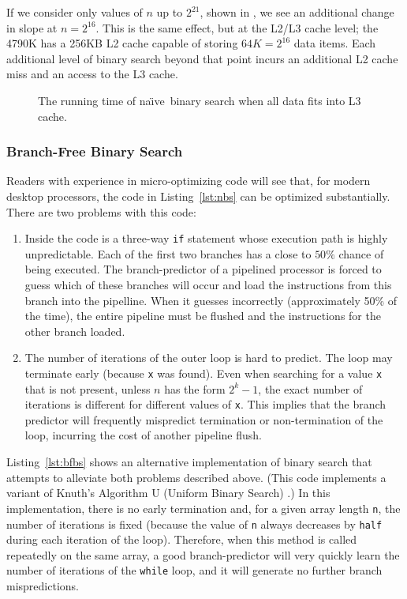 \documentclass{patmorin}
\newcommand{\lstref}[1]{Listing~\ref{lst:#1}}
\newcommand{\Lstref}[1]{\lstref{#1}}
\newcommand{\naive}{na\"{\i}ve}
\begin{document}
If we consider only values of $n$ up to $2^{21}$, shown in
, we see an additional change in slope at
$n=2^{16}$.  This is the same effect, but at the L2/L3 cache level; the
4790K has a 256KB L2 cache capable of storing $64K=2^{16}$ data items.
Each additional level of binary search beyond that point incurs an
additional L2 cache miss and an access to the L3 cache.

\begin{figure}
   \caption{The running time of \naive\ binary search when all data
    fits into L3 cache.}
\end{figure}


\subsubsection{Branch-Free Binary Search}

Readers with experience in micro-optimizing code will see that, for
modern desktop processors, the code in \lstref{nbs} can be optimized
substantially.  There are two problems with this code:

\begin{enumerate}

\item Inside the code is a three-way \texttt{if} statement whose
execution path is highly unpredictable. Each of the first two branches
has a close to $50\%$ chance of being executed.  The branch-predictor of
a pipelined processor is forced to guess which of these branches will
occur and load the instructions from this branch into the pipelline.
When it guesses incorrectly (approximately 50\% of the time), the entire
pipeline must be flushed and the instructions for the other branch loaded.

\item The number of iterations of the outer loop is hard to predict. The
loop may terminate early (because \texttt{x} was found). Even
when searching for a value \texttt{x} that is not present,
unless $n$ has the form $2^k-1$, the exact number of iterations is
different for different values of \texttt{x}.  This implies
that the branch predictor will frequently mispredict termination or
non-termination of the loop, incurring the cost of another pipeline flush.

\end{enumerate}

\Lstref{bfbs} shows an alternative implementation of binary search
that attempts to alleviate both problems described above. (This
code implements a variant of Knuth's Algorithm U (Uniform Binary Search)
\cite[Section~6.2.1]{knuth:art}.)  In this implementation, there is no
early termination and, for a given array length \texttt{n}, the
number of iterations is fixed (because the value of \texttt{n}
always decreases by \texttt{half} during each iteration of
the loop).  Therefore, when this method is called repeatedly on the
same array, a good branch-predictor will very quickly learn the number
of iterations of the \texttt{while} loop, and it will generate
no further branch mispredictions.
\end{document}

